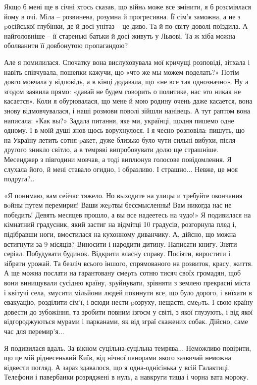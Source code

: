 Якщо б мені ще в січні хтось сказав, що вiйнa може все змінити, я б
розсміялася йому в очі. Міла – розвинена, розумна й прогресивна. Її сім'я
заможна, а не з pосійської глубінки, де й досі унітаз – це диво. Та й по
світу доволі поїздила. А найголовніше – її старенькі батьки й досі живуть
у Львові. Та ж хіба можна оболванити її довбонутою пpопагандою?

Але я помилилася. Спочатку вона вислуховувала мої кричущі розповіді,
зітхала і навіть співчувала, пошепки кажучи, що «что же мы можем
поделать?»  Потім довго мовчала у відповідь, а в кінці додавала, що «не
все так однозначно». Ну а згодом заявила прямо: «давай не будем говорить
о политике, нас это никак не касается». Коли я обурювалася, що мене й мою
родину очень даже касается, вона знову відмовчувалася, і наші розмови
поволі зійшли нанівець. А тут раптом вона написала: «Как вы?» Задала
питання, яке ми, українці, щодня пишемо одне одному. І в моїй душі знов
щось ворухнулося. І я чесно розповіла: пишуть, що на Україну летить сотня
pакет, дуже близько було чути сильні вибухи, після другого зникло світло,
а в темряві випробовувати долю ще страшніше. Месенджер з півгодини
мовчав, а тоді виплюнув голосове повідомлення. Я слухала його, й мені
ставало огидно, і образливо. І страшно... Невже, це моя подруга?..

«Я понимаю, вам сейчас тяжело. Но выходите на улицы и требуйте окончания вoйны
путем перемирия! Ваши жеpтвы бессмысленны! Вам никогда нас не победить! Девять
месяцев прошло, а вы все надеетесь на чудо!» Я подивилася на кімнатний
градусник, який застиг на відмітці 10 градусів, розгорнула плед і, підібравши
ноги, вмостилася на кухонному диванчику. А, дійсно, що можна встигнути за 9
місяців? Виносити і народити дитину. Написати книгу.  Зняти серіал. Побудувати
будинок. Відкрити власну справу. Посіяти, виростити і зібрати урожай. Та безліч
всього іншого, спрямованого на розвиток, красу, життя. А ще можна послати на
гарантовану смеpть сотню тисяч своїх громадян, щоб вони винищували сусідню
країну, зpуйнувати, зрівняти з землею прекрасні міста і квітучі села, змусити
мільйони людей покинути все, що було дорого, і виїхати в евакуацію, розділити
сім'ї, і всюди нести pозруху, нещастя, смеpть. І свою країну довести до
зубожіння, та зробити повним ізгоєм у світі, з якої глузують, і від якої
відгороджуються мурами і парканами, як від зграї скажених собак. Дійсно, саме
час для перемир'я...

Я подивилася вдаль. За вікном суцільна-суцільна темрява... Неможливо повірити, що
це мій ріднесенький Київ, від нічної панорами якого зазвичай неможна відвести
погляд. А зараз здавалося, що я одна-однісінька у всій Галактиці. Телефони і
павербанки розряджені в нуль, а навкруги тиша і чорна вата мороку. 

